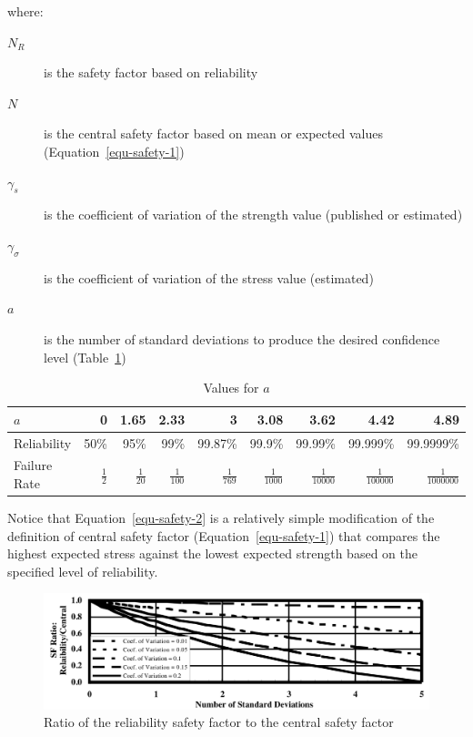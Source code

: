 \noindent where:

\begin{description}
  \item[$N_R$] is the safety factor based on reliability
  \item[$N$] is the central safety factor based on mean or expected values (Equation~\ref{equ-safety-1})
  \item[$\gamma_s$] is the coefficient of variation of the strength value (published or estimated)
  \item[$\gamma_\sigma$] is the coefficient of variation of the stress value (estimated)
  \item[$a$] is the number of standard deviations to produce the desired confidence level (Table~\ref{tbl-a})
\end{description}

\begin{table}
  \center{}
  \small
  \begin{tabular}{l r r r r r r r r}
    \toprule
    $a$ & 0 & 1.65 & 2.33 & 3 & 3.08 & 3.62 & 4.42 & 4.89 \\
    \midrule
    Reliability & 50\% & 95\% & 99\% & 99.87\% & 99.9\% & 99.99\% & 99.999\% & 99.9999\% \\
    Failure Rate & $\frac{1}{2}$ & $\frac{1}{20}$ & $\frac{1}{100}$ & $\frac{1}{769}$ & $\frac{1}{1000}$ & $\frac{1}{10000}$ & $\frac{1}{100000}$ & $\frac{1}{1000000}$ \\
    \bottomrule
  \end{tabular}
  \vspace{2em}
  \caption{Values for $a$}
  \label{tbl-a}
\end{table}

Notice that Equation~\ref{equ-safety-2} is a relatively simple modification of the definition of central safety factor (Equation~\ref{equ-safety-1}) that compares the highest expected stress against the lowest expected strength based on the specified level of reliability.

\begin{figure}
  \centering
  \includegraphics[width=\textwidth]{A1_safety_factor/sf-ratio.png}
  \caption{Ratio of the reliability safety factor to the central safety factor}
\end{figure}

